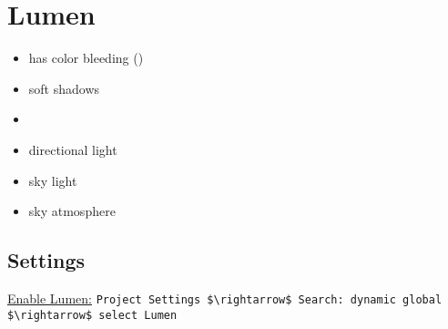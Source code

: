 \chapter{Lumen}
    \begin{itemize}
        \item has color bleeding ()
        \item soft shadows
        \item 
    \end{itemize}

    \begin{itemize}
        \item directional light
        \item sky light
        \item sky atmosphere
    \end{itemize}

    \section{Settings}
        \uline{Enable Lumen:} \colorbox{mygray}{\lstinline{Project Settings $\rightarrow$ Search: dynamic global $\rightarrow$ select Lumen}} \\
        \uline{}
